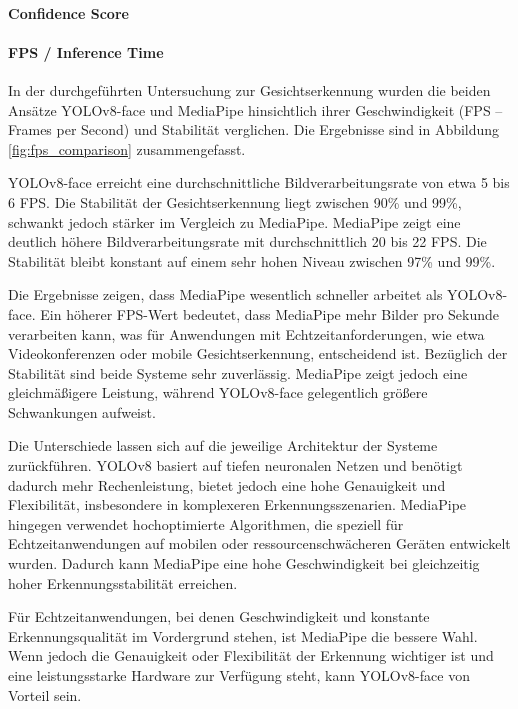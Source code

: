 \paragraph{Confidence Score}
\paragraph{FPS / Inference Time}

In der durchgeführten Untersuchung zur Gesichtserkennung wurden die beiden Ansätze YOLOv8-face und MediaPipe hinsichtlich ihrer Geschwindigkeit (FPS – Frames per Second) und Stabilität verglichen.
Die Ergebnisse sind in Abbildung \ref{fig:fps_comparison} zusammengefasst.

YOLOv8-face erreicht eine durchschnittliche Bildverarbeitungsrate von etwa 5 bis 6 FPS. Die Stabilität der Gesichtserkennung liegt zwischen 90\% und 99\%, schwankt jedoch stärker im Vergleich zu MediaPipe.
MediaPipe zeigt eine deutlich höhere Bildverarbeitungsrate mit durchschnittlich 20 bis 22 FPS. Die Stabilität bleibt konstant auf einem sehr hohen Niveau zwischen 97\% und 99\%.

Die Ergebnisse zeigen, dass MediaPipe wesentlich schneller arbeitet als YOLOv8-face. Ein höherer FPS-Wert bedeutet, dass MediaPipe mehr Bilder pro Sekunde verarbeiten kann, was für Anwendungen mit Echtzeitanforderungen, wie etwa Videokonferenzen oder mobile Gesichtserkennung, entscheidend ist.
Bezüglich der Stabilität sind beide Systeme sehr zuverlässig. MediaPipe zeigt jedoch eine gleichmäßigere Leistung, während YOLOv8-face gelegentlich größere Schwankungen aufweist.

Die Unterschiede lassen sich auf die jeweilige Architektur der Systeme zurückführen. YOLOv8 basiert auf tiefen neuronalen Netzen und benötigt dadurch mehr Rechenleistung, bietet jedoch eine hohe Genauigkeit und Flexibilität, insbesondere in komplexeren Erkennungsszenarien. 
MediaPipe hingegen verwendet hochoptimierte Algorithmen, die speziell für Echtzeitanwendungen auf mobilen oder ressourcenschwächeren Geräten entwickelt wurden. Dadurch kann MediaPipe eine hohe Geschwindigkeit bei gleichzeitig hoher Erkennungsstabilität erreichen.

Für Echtzeitanwendungen, bei denen Geschwindigkeit und konstante Erkennungsqualität im Vordergrund stehen, ist MediaPipe die bessere Wahl. Wenn jedoch die Genauigkeit oder Flexibilität der Erkennung wichtiger ist und eine leistungsstarke Hardware zur Verfügung steht, kann YOLOv8-face von Vorteil sein.

